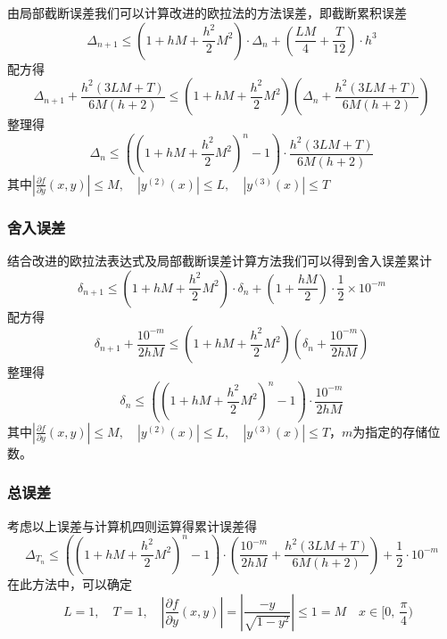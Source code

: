 \documentclass[lang=cn,11pt,a4paper]{elegantpaper}
\begin{document}
由局部截断误差我们可以计算改进的欧拉法的方法误差，即截断累积误差
\begin{equation}
  \Delta_{n+1} \leqslant\left(1+h M+\frac{h^{2}}{2} M^{2}\right) \cdot \Delta_{n}+\left(\frac{L M}{4}+\frac{T}{12}\right) \cdot h^{3}
\end{equation}
配方得
\begin{equation}
  \Delta_{n+1}+\frac{h^{2}(3 L M+T)}{6 M(h+2)} \leqslant\left(1+h M+\frac{h^{2}}{2} M^{2}\right)\left(\Delta_{n}+\frac{h^{2}(3 L M+T)}{6 M(h+2)}\right)
\end{equation}
整理得
\begin{equation}
  \Delta_{n} \leq\left(\left(1+h M+\frac{h^{2}}{2} M^{2}\right)^{n}-1\right)\cdot\frac{h^{2}(3 LM+T)}{6 M(h+2)}
\end{equation}
其中$\left|\frac{\partial f}{\partial y}(x, y)\right| \leqslant M,\quad \left|y^{(2)}(x)\right| \leqslant L,\quad \left|y^{(3)}(x)\right| \leqslant T$
\subsubsection{舍入误差}
结合改进的欧拉法表达式及局部截断误差计算方法我们可以得到舍入误差累计
\begin{equation}
  \delta_{n+1} \leqslant\left(1+h M+\frac{h^{2}}{2} M^{2}\right) \cdot \delta_{n}+\left(1+\frac{h M}{2}\right) \cdot \frac{1}{2} \times 10^{-m}
\end{equation}
配方得
\begin{equation}
  \delta_{n+1}+\frac{10^{-m}}{2hM} \leqslant\left(1+h M+\frac{h^{2}}{2} M^{2}\right)\left(\delta_{n}+\frac{10^{-m}}{2hM}\right)
\end{equation}
整理得
\begin{equation}
  \delta_{n} \leq\left(\left(1+h M+\frac{h^{2}}{2} M^{2}\right)^{n}-1 \right)\cdot\frac{10^{-m}}{2hM}
\end{equation}
其中$\left|\frac{\partial f}{\partial y}(x, y)\right| \leqslant M,\quad \left|y^{(2)}(x)\right| \leqslant L,\quad \left|y^{(3)}(x)\right| \leqslant T$，$m$为指定的存储位数。
\subsubsection{总误差}
考虑以上误差与计算机四则运算得累计误差得
\begin{equation}
  \Delta_{T_n} \leq\left(\left(1+h M+\frac{h^{2}}{2} M^{2}\right)^{n}-1 \right)\cdot\left(\frac{10^{-m}}{2hM}+\frac{h^{2}(3 LM+T)}{6 M(h+2)}\right)+\frac{1}{2}\cdot 10^{-m}
\end{equation}
在此方法中，可以确定
\begin{equation}
  \quad L=1,\quad T=1,\quad \left|\frac{\partial f}{\partial y}(x, y)\right| = \left|\frac{-y}{\sqrt{1-y^2}}\right| \leqslant 1 = M\quad x\in[0,\ \frac{\pi}{4})
\end{equation}
\end{document}
